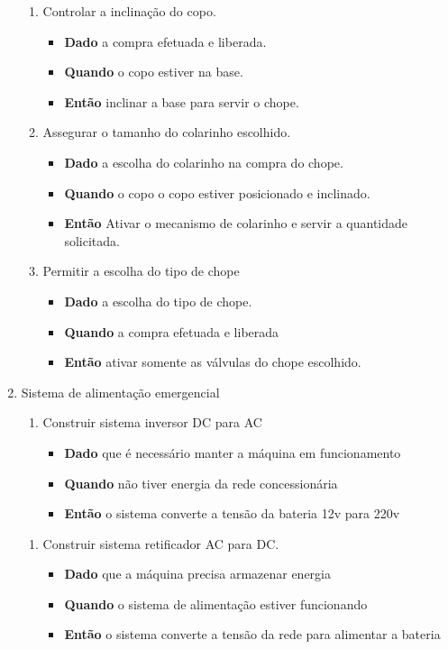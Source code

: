 \begin{enumerate}
\begin{enumerate}
				\item Controlar a inclinação do copo.
						\begin{itemize}
							\item \textbf{Dado} a compra efetuada e liberada.
							\item \textbf{Quando} o copo estiver na base.
							\item \textbf{Então} inclinar a base para servir o chope.
						\end{itemize}

				\item Assegurar o tamanho do colarinho escolhido.
						\begin{itemize}
							\item \textbf{Dado} a escolha do colarinho na compra do chope.
							\item \textbf{Quando} o copo o copo estiver posicionado e inclinado.
							\item \textbf{Então} Ativar o mecanismo de colarinho e servir a quantidade solicitada.
						\end{itemize}

				\item Permitir a escolha do tipo de chope
						\begin{itemize}
							\item \textbf{Dado} a escolha do tipo de chope.
							\item \textbf{Quando} a compra efetuada e liberada
							\item \textbf{Então} ativar somente as válvulas do chope escolhido.
						\end{itemize}
				\end{enumerate}

			\item Sistema de alimentação emergencial
				\begin{enumerate}
					\item Construir sistema inversor DC para AC
						\begin{itemize}
							\item \textbf{Dado} que é necessário manter a máquina em funcionamento
							\item \textbf{Quando} não tiver energia da rede concessionária
							\item \textbf{Então} o sistema converte a tensão da bateria 12v para 220v
						\end{itemize}
				\end{enumerate}

				\begin{enumerate}
					\item Construir sistema retificador AC para DC.
						\begin{itemize}
							\item \textbf{Dado} que a máquina precisa armazenar energia
							\item \textbf{Quando} o sistema de alimentação estiver funcionando
							\item \textbf{Então} o sistema converte a tensão da rede para alimentar a bateria
						\end{itemize}
				\end{enumerate}


\end{enumerate}
